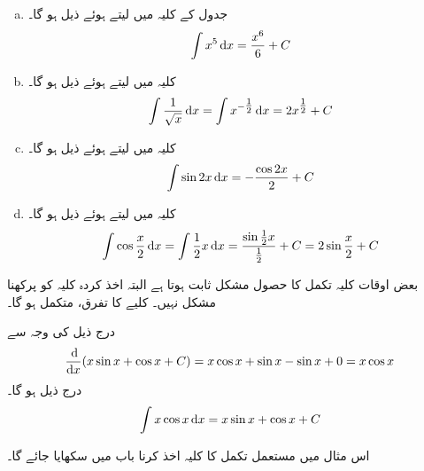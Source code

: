 \begin{enumerate}[a.]
\item
 جدول  کے کلیہ  میں   لیتے ہوئے ذیل ہو گا۔
\begin{align*}
\int x^5\dif x=\frac{x^6}{6}+C
\end{align*}
\item
کلیہ  میں  لیتے ہوئے ذیل ہو گا۔
\begin{align*}
\int \frac{1}{\sqrt{x}}\dif x=\int x^{-\tfrac{1}{2}}\dif x=2x^{\tfrac{1}{2}}+C
\end{align*}
\item
کلیہ   میں  لیتے ہوئے ذیل ہو گا۔
\begin{align*}\int\sin 2x\dif x=-\frac{\cos 2x}{2}+C\end{align*}

\item
کلیہ  میں  لیتے ہوئے ذیل ہو گا۔
\begin{align*}\int\cos \frac{x}{2}\dif x=\int\frac{1}{2}x\dif x=\frac{\sin \tfrac{1}{2}x}{\tfrac{1}{2}}+C=2\sin\frac{x}{2}+C\end{align*}
\end{enumerate}

بعض اوقات کلیہ تکمل کا حصول مشکل ثابت ہوتا ہے البتہ  اخذ کردہ کلیہ کو پرکھنا مشکل نہیں۔ کلیے   کا تفرق، متکمل ہو گا۔

درج ذیل کی  وجہ سے
\begin{align*}
\frac{\dif}{\dif x}(x\sin x+\cos x+C)=x\cos x+\sin x-\sin x+0=x\cos x
\end{align*}
درج ذیل ہو گا۔
\begin{align*}
\int x\cos x\dif x=x\sin x+\cos x+C
\end{align*}

اس مثال میں مستعمل  تکمل کا کلیہ اخذ کرنا  باب  میں  سکھایا جائے گا۔

